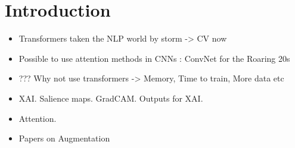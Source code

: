 \section{Introduction}
\begin{itemize}
\item Transformers taken the NLP world by storm -> CV now
\item Possible to use attention methods in CNNs : ConvNet for the Roaring 20s
\item ??? Why not use transformers -> Memory, Time to train, More data etc
\item XAI. Salience maps. GradCAM. Outputs for XAI.
\item Attention.
\item Papers on Augmentation
\end{itemize}
